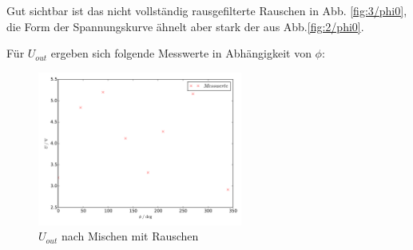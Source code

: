 Gut sichtbar ist das nicht vollständig rausgefilterte Rauschen in Abb.
\ref{fig:3/phi0}, die Form der
Spannungskurve ähnelt aber stark der aus Abb.\ref{fig:2/phi0}.

Für $U_{out}$ ergeben sich folgende Messwerte in Abhängigkeit von $\phi$:

\begin{figure}[H]
  \centering
  \includegraphics[width=0.6\textwidth, height=0.3\textwidth]{plot3u.pdf}
  \caption{$U_{out}$ nach Mischen mit Rauschen}
  \label{fig:plot3u}
\end{figure}

